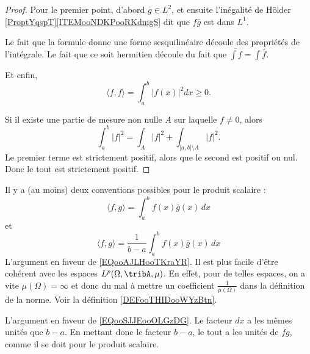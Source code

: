 \begin{proof}
    Pour le premier point, d'abord \( \bar g\in L^2\), et ensuite l'inégalité de Hölder \ref{ProptYqspT}\ref{ITEMooNDKPooRKdmgS} dit que \( f\bar g\) est dans \( L^1\).

    Le fait que la formule donne une forme sesquilinéaire découle des propriétés de l'intégrale. Le fait que ce soit hermitien découle du fait que \( \overline{ \int f }=\int\bar f\).

    Et enfin,
    \begin{equation}
        \langle f,f \rangle =\int_a^b| f(x) |^2dx\geq 0.
    \end{equation}
    
    Si il existe une partie de mesure non nulle \( A\) sur laquelle \( f\neq 0\), alors
    \begin{equation}
        \int_a^b| f |^2=\int_A| f |^2+\int_{\mathopen[ a , b \mathclose]\setminus A}| f |^2.
    \end{equation}
    Le premier terme est strictement positif, alors que le second est positif ou nul. Donc le tout est strictement positif.
\end{proof}

\begin{normaltext}
    Il y a (au moins) deux conventions possibles pour le produit scalaire :
    \begin{equation}    \label{EQooAJLHooTKraYR}
        \langle f, g\rangle =\int_a^bf(x)\bar g(x)\,dx
    \end{equation}
    et
    \begin{equation}    \label{EQooSJJEooOLGzDG}
        \langle f, g\rangle =\frac{1}{ b-a }\int_a^bf(x)\bar g(x)\,dx
    \end{equation}
    L'argument en faveur de \eqref{EQooAJLHooTKraYR}. Il est plus facile d'être cohérent avec les espaces \( L^p(\Omega, \tribA, \mu)\). En effet, pour de telles espaces, on a vite \( \mu(\Omega)=\infty\) et donc du mal à mettre un coefficient \( \frac{1}{ \mu(\Omega) }\) dans la définition de la norme. Voir la définition \ref{DEFooTHIDooWYzBtn}.

    L'argument en faveur de \eqref{EQooSJJEooOLGzDG}. Le facteur \( dx\) a les mêmes unités que \( b-a\). En mettant donc le facteur \( b-a\), le tout a les unités de \( fg\), comme il se doit pour le produit scalaire.
\end{normaltext}

